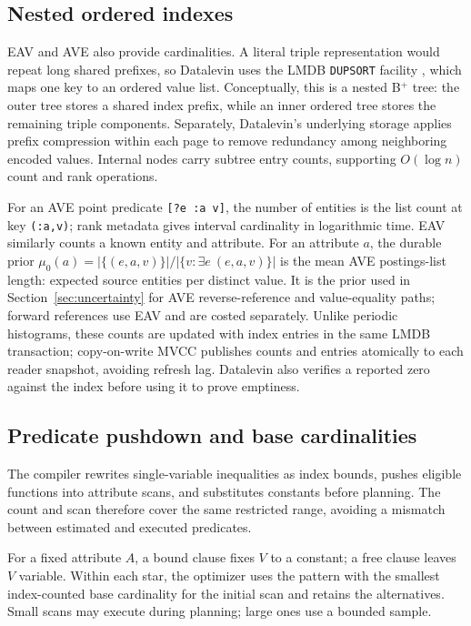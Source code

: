 \documentclass[sigconf]{cidr-2027}
\begin{document}
\subsection{Nested ordered indexes}

EAV and AVE also provide cardinalities. A literal triple representation would
repeat long shared prefixes, so Datalevin uses the
LMDB \texttt{DUPSORT} facility \cite{chu2011mdb},
which maps one key to an ordered value list. Conceptually, this is a nested
B$^+$ tree: the outer tree stores a shared index prefix, while an inner
ordered tree stores the remaining triple components. Separately, Datalevin's
underlying storage applies prefix compression within each page to remove
redundancy among neighboring encoded values. Internal nodes carry subtree
entry counts, supporting $O(\log n)$ count and rank operations.

For an AVE point predicate \texttt{[?e :a v]}, the number of entities is the
list count at key \texttt{(:a,v)}; rank metadata gives interval cardinality in
logarithmic time. EAV similarly counts a known entity and attribute. For an
attribute $a$, the durable prior
$\mu_0(a)=|\{(e,a,v)\}|/|\{v:\exists e\ (e,a,v)\}|$ is the mean AVE
postings-list length: expected source entities per distinct value. It is the
prior used in Section~\ref{sec:uncertainty} for AVE reverse-reference and
value-equality paths; forward references use EAV and are costed separately.
Unlike periodic histograms, these counts are updated with index entries in the
same LMDB transaction; copy-on-write MVCC publishes counts and entries
atomically to each reader snapshot, avoiding refresh lag. Datalevin also
verifies a reported zero against the index before using it to prove emptiness.

\subsection{Predicate pushdown and base cardinalities}

The compiler rewrites single-variable inequalities as index bounds, pushes
eligible functions into attribute scans, and substitutes constants before
planning. The count and scan therefore cover the same restricted range,
avoiding a mismatch between estimated and executed predicates.

For a fixed attribute $A$, a bound clause fixes $V$ to a constant; a free
clause leaves $V$ variable. Within each star, the optimizer uses
the pattern with the smallest index-counted base cardinality for the initial
scan and retains the alternatives. Small scans may execute during planning;
large ones use a bounded sample.
\end{document}
